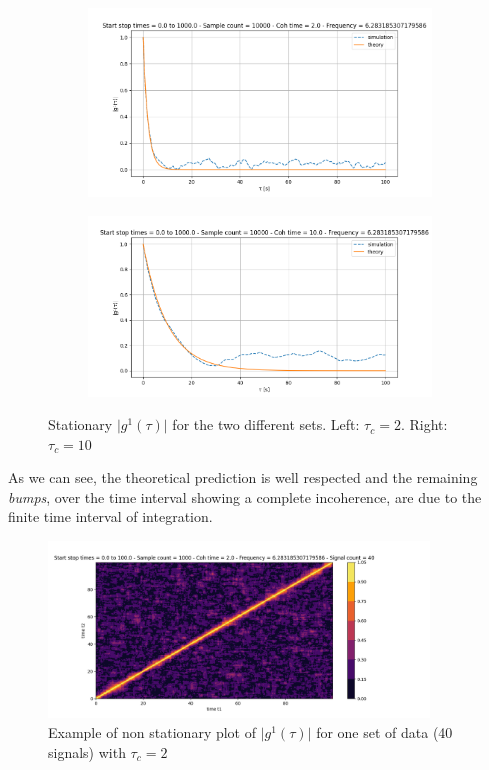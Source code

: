 \documentclass[11pt]{report}
\begin{document}
\begin{figure}[h!]
\centering
\begin{subfigure}{.48\textwidth}
  \centering
  \includegraphics[width=1.1\linewidth]{test_stat_2}
\end{subfigure}%
\hspace{1em}%
\begin{subfigure}{.48\textwidth}
  \centering
  \includegraphics[width=1.1\linewidth]{test_stat_10}
\end{subfigure}
\caption{Stationary $\vert g^1(\tau) \vert$ for the two different sets. Left: $\tau_c=2$. Right: $\tau_c=10$}
\end{figure}

As we can see, the theoretical prediction is well respected and the remaining \textit{bumps}, over the time interval showing a complete incoherence, are due to the finite time interval of integration.

\begin{figure}[h!]
\caption{Example of non stationary plot of $\vert g^1(\tau) \vert$ for one set of data (40 signals) with $\tau_c=2$}
\centering
\includegraphics[width=0.9\textwidth]{test_g12}
\end{figure}
\end{document}
